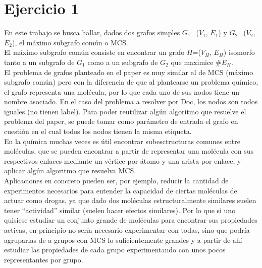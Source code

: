 \section{Ejercicio 1}

\noindent En este trabajo se busca hallar, dados dos grafos simples $G_{1}$=($V_{1}$, $E_{1}$) y $G_{2}$=($V_{2}$, $E_{2}$), el máximo subgrafo común o MCS.\\
El máximo subgrafo común consiste en encontrar un grafo $H$=($V_{H}$, $E_{H}$) isomorfo tanto a un subgrafo de  $G_{1}$ como a un subgrafo de $G_{2}$ que maximice $\#E_{H}$.\\
El problema de grafos planteado en el paper es muy similar al de MCS (máximo subgrafo común) pero con la diferencia de que al plantearse un problema químico, el grafo representa una molécula, por lo que cada uno de sus nodos tiene un nombre asociado. En el caso del problema a resolver por Doc, los nodos son todos iguales (no tienen label). Para poder reutilizar algún algoritmo que resuelve el problema del paper, se puede tomar como parámetro de entrada el grafo en cuestión en el cual todos los nodos tienen la misma etiqueta.\\
En la química muchas veces es útil encontrar subesctructuras comunes entre moléculas, que se pueden encontrar a partir de representar una molécula con sus respectivos enlaces mediante un vértice por átomo y una arista por enlace, y aplicar algún algoritmo que resuelva MCS.\\
Aplicaciones en concreto pueden ser, por ejemplo, reducir la cantidad de experimentos necesarios para entender la capacidad de ciertas moléculas de actuar como drogas, ya que dado dos moléculas estructuralmente similares suelen tener ``actividad'' similar (suelen hacer efectos similares). Por lo que si uno quisiese estudiar un conjunto grande de moléculas para encontrar sus propiedades activas, en principio no sería necesario experimentar con todas, sino que podría agruparlas de a grupos con MCS lo suficientemente grandes y a partir de ahí estudiar las propiedades de cada grupo experimentando con unos pocos representantes por grupo.